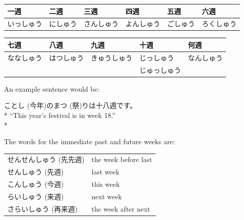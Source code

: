 \documentclass[11pt, b5paper, twoside, openright, onecolumn]{book}
\makeatletter
\newcommand*{\rtrubystack}[2]{{\relscale{0.5}%
  \begin{tabular}[b]{@{}c@{}}%
    {#1}\\%
    {\textscale{2}{#2}}%
  \end{tabular}}%
}
\DeclareRobustCommand*{\rtruby}[2]{%
  \mbox{%
    \setlength{\parskip}{0ex}%
    \BeginAccSupp{method=pdfstringdef,ActualText={#1}}%
      \rtrubystack{\phantom{#2}}{#1}%
      \llap{%
        \rtrubystack{#2}{\phantom{#1}}%
      }%
    \EndAccSupp{}%
  }%
}
\newcommand*{\rubystack}[2]{{\relscale{0.5}%
  \begin{tabular}[b]{@{}c@{}}%
    {#1}\\%
   {\textscale{2}{#2}}%
  \end{tabular}}%
}
\DeclareRobustCommand*{\ruby}[2]{%
  \mbox{%
    \setlength{\parskip}{0ex}%
    \BeginAccSupp{method=pdfstringdef,ActualText={#1}}%
      \rubystack{\phantom{#2}}{#1}%
      \llap{%
        \rubystack{#2}{\phantom{#1}}%
      }%
    \EndAccSupp{}%
  }%
}
\renewcommand*{\rtruby}[2]{#2 (#1)}%
\renewcommand*{\ruby}[2]{#2 (#1)}%
\newenvironment{exampleblock}{
\setlength{\parindent}{0.6in}
\begin{minipage}[t]{\dimexpr\textwidth-\parindent}}
{\end{minipage}}
\newenvironment{mytabular}[1]{\noindent\hspace{0.4in}
\begin{tabular}[h]{#1}}{\end{tabular}}
\newenvironment{mytabularcentered}[1]{\noindent
\begin{center}\begin{tabular}[h]{#1}}{\end{tabular}\end{center}}
\makeatother
\begin{document}
\vspace{0.5cm}
\smaller
\begin{mytabular}{| l  l  l  l  l  l |}\hline 
\rule{0pt}{2.4ex}一週 & 二週 & 三週 & 四週 & 五週 & 六週\\ 
\hline
\rule{0pt}{2.4ex}いっしゅう & にしゅう & さんしゅう & よんしゅう & ごしゅう & ろくしゅう\\ 
\hline 
\end{mytabular}
\larger
\vspace{0.5cm}

\smaller
\begin{mytabular}{| l  l  l  l  l |}\hline 
\rule{0pt}{2.4ex}七週 & 八週 & 九週 & 十週 & 何週\\ 
\hline
\rule{0pt}{2.4ex}ななしゅう & はつしゅう & きゅうしゅう & じっしゅう & なんしゅう\\ 
\rule{0pt}{2.4ex} &  &  & じゅっしゅう & \\ 
\hline 
\end{mytabular}
\larger
\vspace{0.5cm}


An example sentence would be:

\vspace{0.4cm}
\begin{exampleblock}
\ruby{今年}{ことし}の\ruby{祭}{まつ}りは十八週です。 \\* 
“This year’s festival is in week 18.” \\* 
\end{exampleblock}
\vspace{0.2cm}

The words for the immediate past and future weeks are:

\vspace{0.5cm}
\smaller
\begin{center}
\begin{mytabularcentered}{| l  l |}\hline 
\rule{0pt}{3.6ex}\index[japanese]{せんせんしゅう (先先週)}\rtruby{先先週}{せんせんしゅう} & the \index[english]{Week before last}week before last\\ 
\rule{0pt}{3.6ex}\index[japanese]{せんしゅう (先週)}\rtruby{先週}{せんしゅう} & \index[english]{Last week}last week\\ 
\rule{0pt}{3.6ex}\index[japanese]{こんしゅう (今週)}\rtruby{今週}{こんしゅう} & \index[english]{This week}this week\\ 
\rule{0pt}{3.6ex}\index[japanese]{らいしゅう (来週)}\rtruby{来週}{らいしゅう} & \index[english]{Next week}next week\\ 
\rule{0pt}{3.6ex}\index[japanese]{さらいしゅう (再来週)}\rtruby{再来週}{さらいしゅう} & the \index[english]{Week after next}week after next\\ 
\hline 
\end{mytabularcentered}
\end{center}
\larger
\end{document}
